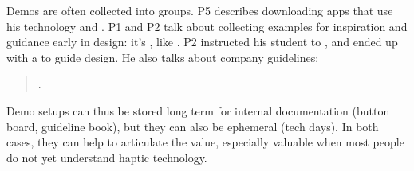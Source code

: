 Demos are often collected into groups.
P5 describes downloading apps that use his technology and .
P1 and P2 talk about collecting examples for inspiration and guidance early in design:
it's , like .
P2 instructed his student to , and ended up with a  to guide design.
He also talks about company guidelines:

\begin{quote}
    .
\end{quote}

Demo setups can thus be stored long term for internal documentation (button board, guideline book), but they can also be ephemeral (tech days).
In both cases, they can help to articulate the value, especially valuable when most people do not yet understand haptic technology.


